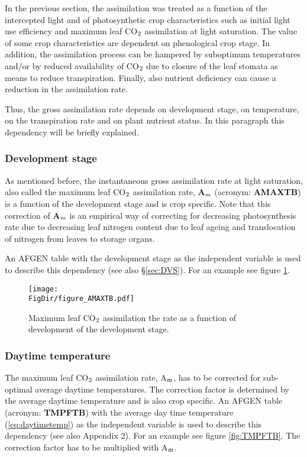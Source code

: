 In the previous section, the assimilation was treated as a function of the intercepted light and of
photosynthetic crop characteristics such as initial light use efficiency and maximum leaf
CO$_{{\rm 2}}$ assimilation at light saturation. The value of some crop characteristics are dependent
on phenological crop stage. In addition, the assimilation process can be hampered by
suboptimum temperatures and/or by reduced availability of CO$_{{\rm 2}}$ due to closure of the leaf
stomata as means to reduce transpiration. Finally, also nutrient deficiency can cause a reduction
in the assimilation rate.

Thus, the gross assimilation rate depends on development stage, on temperature, on the transpiration rate
and on plant nutrient status. In this paragraph this dependency will be briefly explained.

\subsubsection{Development stage}
As mentioned before, the instantaneous gross assimilation rate at light saturation, also
called the maximum leaf CO$_{{\rm 2}}$ assimilation rate, {\bf A$_{{\rm m}}$} (acronym: 
{\bf AMAXTB}) is a function of the development stage and is crop specific. Note that this
correction of {\bf A$_{{\rm m}}$} is an empirical way of correcting for decreasing photosynthesis
rate due to decreasing leaf nitrogen content due to leaf ageing and  translocation of nitrogen
from leaves to storage organs. 

An AFGEN table with the development stage as the independent variable is used to describe 
this dependency (see also \S \ref{sec:DVS}). For an example see figure \ref{fig:AMAXTB}.

\begin{figure}[p]
	\centering
	\texttt{[image: \\FigDir/figure\_AMAXTB.pdf]}
	\caption{Maximum leaf CO$_{{\rm 2}}$ assimilation the rate as a function of development of
		the development stage.}
	\label{fig:AMAXTB}
\end{figure}

\subsubsection{Daytime temperature}
The maximum leaf CO$_{{\rm 2}}$ assimilation rate, A$_{{\rm m}}$, has to be corrected for sub-optimal average
daytime temperatures. The correction factor is determined by the average daytime
temperature and is also crop specific. An AFGEN table (acronym: {\bf TMPFTB}) with the
average day time temperature (\ref{eq:daytimetemp}) as the independent variable is used to describe this
dependency (see also Appendix 2). For an example see figure \ref{fig:TMPFTB}. 
The correction factor has to be multiplied with A$_{{\rm m}}$. 

